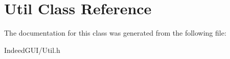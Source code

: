 \hypertarget{class_util}{}\section{Util Class Reference}
\label{class_util}


The documentation for this class was generated from the following file\+:\begin{DoxyCompactItemize}
\item 
Indeed\+G\+U\+I/Util.\+h\end{DoxyCompactItemize}
